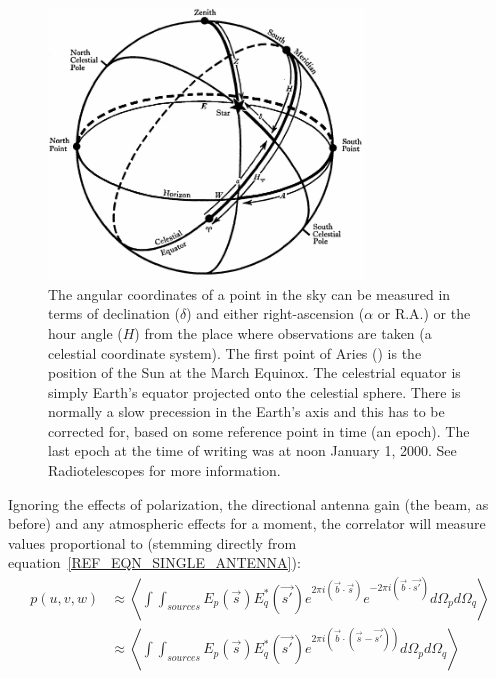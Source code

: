 \begin{figure}[h]
 \begin{mdframed}
 \centering
 \includegraphics[width=0.75\textwidth]{images/equatorial_coords.png}
 \caption[Equatorial and alt-azimuth coordinate system]{The angular coordinates of a point in the sky can be measured in terms of declination ($\delta$) and either right-ascension ($\alpha$ or R.A.) or the hour angle ($H$) from the place
 where observations are taken (a celestial coordinate system). The first point of Aries (\Aries) is the position of the Sun at the March Equinox. The celestrial equator is simply Earth's equator projected onto the celestial sphere. There is normally a slow precession in the Earth's
 axis and this has to be corrected for, based on some reference point in time (an epoch). The last epoch at the time of writing was at noon January 1, 2000. See Radiotelescopes \cite[Appendix 4]{christiansenradiotelescopes} for more information.}
  \label{fig_celestrial_coords}
 \end{mdframed}
\end{figure}

Ignoring the effects of polarization, the directional antenna gain (the beam, as before) and any atmospheric effects
for a moment, the correlator will measure values proportional to (stemming directly from equation~\ref{REF_EQN_SINGLE_ANTENNA}):
\begin{equation*}
  \begin{split}
    p(u,v,w) &\approx \left<\int\int_{sources}{E_p(\vec{s})E_q^*(\vec{s'})e^{2\pi i(\vec{b}\cdot\vec{s})}e^{-2\pi i(\vec{b}\cdot\vec{s'})}d\Omega_pd\Omega_q}\right>\\
	     &\approx \left<\int\int_{sources}{E_p(\vec{s})E_q^*(\vec{s'})e^{2\pi i(\vec{b}\cdot(\vec{s}-\vec{s'}))}d\Omega_pd\Omega_q}\right>\\
  \end{split}
\end{equation*}

